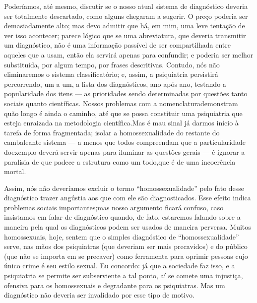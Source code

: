Poderíamos, até mesmo, discutir se o nosso atual sistema de
diagnóstico deveria ser totalmente descartado, como alguns chegaram a
sugerir. O preço poderia ser demasiadamente alto; mas devo admitir que
há, em mim, uma leve tentação de ver isso acontecer; parece lógico que
se uma abreviatura, que deveria transmitir um diagnóstico, não é uma
informação passível de ser compartilhada entre aqueles que a usam,
então ela servirá apenas para confundir; e poderia ser melhor
substituída, por algum tempo, por frases descritivas. Contudo, nós não
eliminaremos o sistema classificatório; e, assim, a psiquiatria
persistirá percorrendo, um a um, a lista dos diagnósticos, ano após
ano, testando a popularidade dos itens --- as prioridades sendo
determinadas por questões tanto sociais\idxdiagforc{} quanto científicas. Nossos
problemas com a nomenclatura\idxdiagnome[|)] demonstram quão longo é ainda o caminho,
até que se possa constituir uma psiquiatria que esteja enraizada na
metodologia científica.\idxdiagmeto[|(] Mas é mau sinal já darmos início à tarefa de
forma fragmentada; isolar a homossexualidade do restante do cambaleante
sistema --- a menos que todos compreendam que a particularidade do\idxmetod[|)]
exemplo deverá servir apenas para iluminar as questões gerais --- é
ignorar a paralisia de que padece a estrutura como um todo,\idxnomen[|)] que é de
uma incoerência mortal.

Assim, nós não deveríamos excluir o termo
``homossexualidade'' pelo fato desse
diagnóstico trazer angústia aos que com ele são diagnosticados. Esse
efeito indica problemas sociais importantes;\idxhomosaspe[|(] mas nosso argumento ficará
confuso, caso insistamos em falar de diagnóstico quando, de fato,
estaremos falando sobre a maneira pela qual os diagnósticos podem ser
usados de maneira perversa. Muitos homossexuais, hoje, sentem que o
simples diagnóstico de ``homossexualidade''
serve, nas mãos dos psiquiatras (que deveriam ser mais precavidos) e do
público (que não se importa em se precaver) como ferramenta para
oprimir pessoas cujo único crime é seu estilo sexual. Eu concordo: já
que a sociedade faz isso, e a psiquiatria se permite ser subserviente a
tal ponto, aí se comete uma injustiça, ofensiva para os homossexuais e
degradante para os psiquiatras. Mas um diagnóstico não deveria ser
invalidado por esse tipo de motivo.

